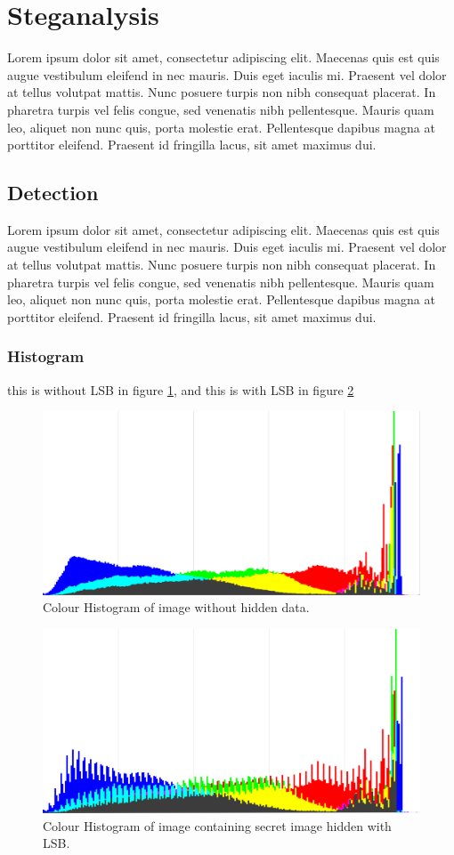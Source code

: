 \section{Steganalysis}
Lorem ipsum dolor sit amet, consectetur adipiscing elit. Maecenas quis est quis augue vestibulum eleifend in nec mauris. Duis eget iaculis mi. Praesent vel dolor at tellus volutpat mattis. Nunc posuere turpis non nibh consequat placerat. In pharetra turpis vel felis congue, sed venenatis nibh pellentesque. Mauris quam leo, aliquet non nunc quis, porta molestie erat. Pellentesque dapibus magna at porttitor eleifend. Praesent id fringilla lacus, sit amet maximus dui.

\subsection*{Detection}
Lorem ipsum dolor sit amet, consectetur adipiscing elit. Maecenas quis est quis augue vestibulum eleifend in nec mauris. Duis eget iaculis mi. Praesent vel dolor at tellus volutpat mattis. Nunc posuere turpis non nibh consequat placerat. In pharetra turpis vel felis congue, sed venenatis nibh pellentesque. Mauris quam leo, aliquet non nunc quis, porta molestie erat. Pellentesque dapibus magna at porttitor eleifend. Praesent id fringilla lacus, sit amet maximus dui.

\subsubsection*{Histogram}
this is without LSB in figure \ref{fig:HistoWithoutLSB}, and this is with LSB in figure \ref{fig:HistoWithLSB}


\begin{figure}
	\centering
	\includegraphics[width=1\textwidth]{figures/HistoLSBCat.png}
	\caption{Colour Histogram of image without hidden data.}
	\label{fig:HistoWithoutLSB}
\end{figure}

\begin{figure}
	\centering
	\includegraphics[width=1\textwidth]{figures/HistoLSBCatEncrypted.png}
	\caption{Colour Histogram of image containing secret image hidden with LSB.}
	\label{fig:HistoWithLSB}
\end{figure}